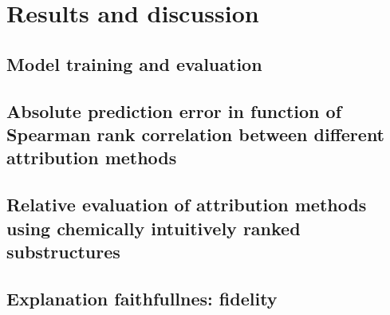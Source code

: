 \chapter{Results and discussion}

\section{Model training and evaluation}


\section{Absolute prediction error in function of Spearman rank correlation between different attribution methods}


\section{Relative evaluation of attribution methods using chemically intuitively ranked substructures}


\section{Explanation faithfullnes: fidelity}

